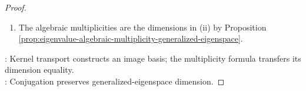 \begin{corollary}
\begin{proof}
\begin{enumerate}[label=(\roman*)]
The space $\mathcal{G}_{\lambda}(T_{\mathbb{C}})$ is finite-dimensional by Theorem \ref{thm:generalized-eigenspace-stabilized-kernel}(ii) and Corollary \ref{cor:finite-dimensional-spaces-and-subspaces-have-bases}(ii).\\
Set $d\defeq\dim_{\mathbb{C}}\mathcal{G}_{\lambda}(T_{\mathbb{C}})$ and choose a basis $(\mathbf{z}_1,\ldots,\mathbf{z}_d)$ by Corollary \ref{cor:finite-dimensional-spaces-and-subspaces-have-bases}(i).\\
If $\sum\limits_{j=1}^{d}a_j\Gamma\mathbf{z}_j=\mathbf{0}$, then $\sum\limits_{j=1}^{d}\overline{a_j}\mathbf{z}_j=\mathbf{0}$ by conjugate-linearity and $\Gamma^2=I_{\mathcal{V}_{\mathbb{C}}}$. Hence $(\forall j\in\{1,\ldots,d\})\,a_j=0$ by independence.\\
Fix $\mathbf{y}\in\mathcal{G}_{\overline{\lambda}}(T_{\mathbb{C}})$ and choose $b_1,\ldots,b_d\in\mathbb{C}$ satisfying $\Gamma\mathbf{y}=\sum\limits_{j=1}^{d}b_j\mathbf{z}_j$ by spanning.\\
Then $\mathbf{y}=\sum\limits_{j=1}^{d}\overline{b_j}\Gamma\mathbf{z}_j$ by conjugate-linearity, $\Gamma^2=I_{\mathcal{V}_{\mathbb{C}}}$. Thus $(\Gamma\mathbf{z}_1,\ldots,\Gamma\mathbf{z}_d)$ is basis of $\mathcal{G}_{\overline{\lambda}}(T_{\mathbb{C}})$, its dimension is $d=\dim_{\mathbb{C}}\mathcal{G}_{\lambda}(T_{\mathbb{C}})$.
\item The algebraic multiplicities are the dimensions in (ii) by Proposition \ref{prop:eigenvalue-algebraic-multiplicity-generalized-eigenspace}.
\end{enumerate}
: Kernel transport constructs an image basis; the multiplicity formula transfers its dimension equality.\\
: Conjugation preserves generalized-eigenspace dimension.
\end{proof}
\end{corollary}

